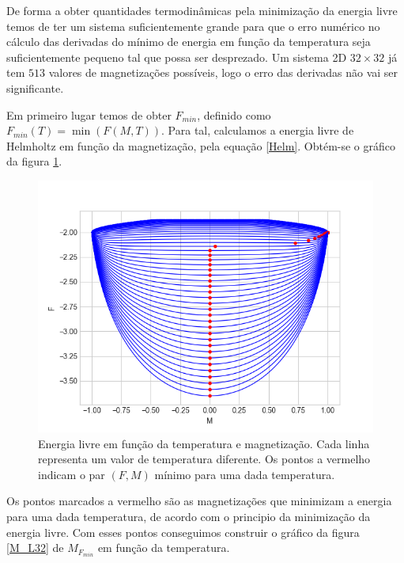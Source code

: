\documentclass[12pt, a4paper]{article}
\begin{document}
	De forma a obter quantidades termodinâmicas pela minimização da energia livre temos de ter um sistema suficientemente grande para que o erro numérico no cálculo das derivadas do mínimo de energia em função da temperatura seja suficientemente pequeno tal que possa ser desprezado. Um sistema 2D $32 \times 32$ já tem $513$ valores de magnetizações possíveis, logo o erro das derivadas não vai ser significante.
	
	Em primeiro lugar temos de obter $F_{min}$, definido como $F_{min} (T) = \min(F(M, T))$. Para tal, calculamos a energia livre de Helmholtz em função da magnetização, pela equação \ref{Helm}. Obtém-se o gráfico da figura \ref{F_L32}.
	\begin{figure}[h]
		\centering
		\includegraphics[scale=0.45]{F_L32.png}
		\caption{Energia livre em função da temperatura e magnetização. Cada linha representa um valor de temperatura diferente. Os pontos a vermelho indicam o par $(F, M)$ mínimo para uma dada temperatura.}
		\label{F_L32}
	\end{figure}
Os pontos marcados a vermelho são as magnetizações que minimizam a energia para uma dada temperatura, de acordo com o principio da minimização da energia livre. Com esses pontos conseguimos construir o gráfico da figura \ref{M_L32} de $M_{F_{min}}$ em função da temperatura.
\end{document}
